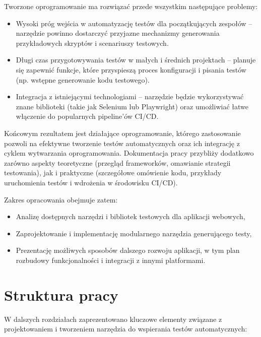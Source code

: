 \documentclass[12pt]{report}
\begin{document}
Tworzone oprogramowanie ma rozwiązać przede wszystkim następujące problemy:
\begin{itemize}
    \item Wysoki próg wejścia w automatyzację testów dla początkujących zespołów – narzędzie powinno dostarczyć przyjazne mechanizmy generowania przykładowych skryptów i scenariuszy testowych.
    \item Długi czas przygotowywania testów w małych i średnich projektach – planuje się zapewnić funkcje, które przyspieszą proces konfiguracji i pisania testów (np. wstępne generowanie kodu testowego).
    \item Integracja z istniejącymi technologiami – narzędzie będzie wykorzystywać znane biblioteki (takie jak Selenium lub Playwright) oraz umożliwiać łatwe włączenie do popularnych pipeline’ów CI/CD.
\end{itemize}

Końcowym rezultatem jest działające oprogramowanie, którego zastosowanie pozwoli na efektywne tworzenie testów automatycznych oraz ich integrację z cyklem wytwarzania oprogramowania. Dokumentacja pracy przybliży dodatkowo zarówno aspekty teoretyczne (przegląd frameworków, omawianie strategii testowania), jak i praktyczne (szczegółowe omówienie kodu, przykłady uruchomienia testów i wdrożenia w środowisku CI/CD).

Zakres opracowania obejmuje zatem:
\begin{itemize}
    \item Analizę dostępnych narzędzi i bibliotek testowych dla aplikacji webowych,
    \item Zaprojektowanie i implementację modularnego narzędzia generującego testy,
    \item Prezentację możliwych sposobów dalszego rozwoju aplikacji, w tym plan rozbudowy funkcjonalności i integracji z innymi platformami.
\end{itemize}

\section{Struktura pracy}
W dalszych rozdziałach zaprezentowano kluczowe elementy związane z projektowaniem i tworzeniem narzędzia do wspierania testów automatycznych:
\end{document}
